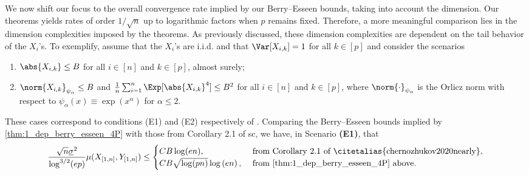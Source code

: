\documentclass[aos]{imsart}
\begin{document}
We now shift our focus to the overall convergence rate implied by our Berry--Esseen bounds, taking into account the dimension. Our theorems yields  rates of order $1/\sqrt{n}$ up to logarithmic factors when $p$ remains fixed. Therefore, a more meaningful comparison lies in the dimension complexities imposed by the theorems. As previously discussed, these dimension complexities are dependent on the tail behavior of the $X_i$'s. To exemplify, assume that the $X_i$'s are i.i.d. and that $\Var[X_{i,k}] = 1$ for all $k \in [p]$ and consider the  scenarios%
\begin{enumerate}[label = {\bf (E\arabic*)}]
    \item $\abs{X_{i,k}} \leq B$ for all {$i \in [n]$ and $k \in [p]$,} almost surely;
    \item $\norm{X_{i,k}}_{\psi_\alpha} \leq B$ and $\frac{1}{n} \sum_{i=1}^n \Exp[\abs{X_{i,k}}^4] \leq B^2$ 
    for all $i \in [n]$ and $k \in [p]$, where $\norm{\cdot}_{\psi_\alpha}$ is the Orlicz norm with respect to $\psi_\alpha(x) \equiv \exp(x^\alpha)$ for $\alpha \leq 2$.
\end{enumerate}
These cases correspond to conditions (E1) and (E2) respectively of .
Comparing the Berry--Esseen bounds implied by \cref{thm:1_dep_berry_esseen_4P} with those from Corollary 2.1 of sc, we have, in Scenario {\bf (E1)}, that %
\begin{equation*}
    \frac{\sqrt{n}\underline{\sigma}^2}{\log^{3/2}(ep)}\mu(X_{[1,n]}, Y_{[1,n]}) \leq 
    \begin{cases}
    C B 
    \log(en), &\mbox{ from Corollary 2.1 of \citetalias{chernozhukov2020nearly}},\\
    C B
    \sqrt{\log(pn)} \log\left(en\right), &\mbox{ from \cref{thm:1_dep_berry_esseen_4P} above.}
    \end{cases}
\end{equation*}
\end{document}
